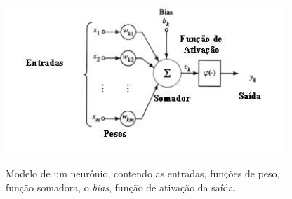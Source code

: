 \begin{figure}[H]
  \centering
  \caption{Modelo de um neurônio, contendo as entradas, funções de peso, função somadora, o \textit{bias}, função de ativação da saída.}
  \includegraphics[width=300pt]{dados/figuras/neuron}
  \label{fig:neuronio}
\end{figure}

